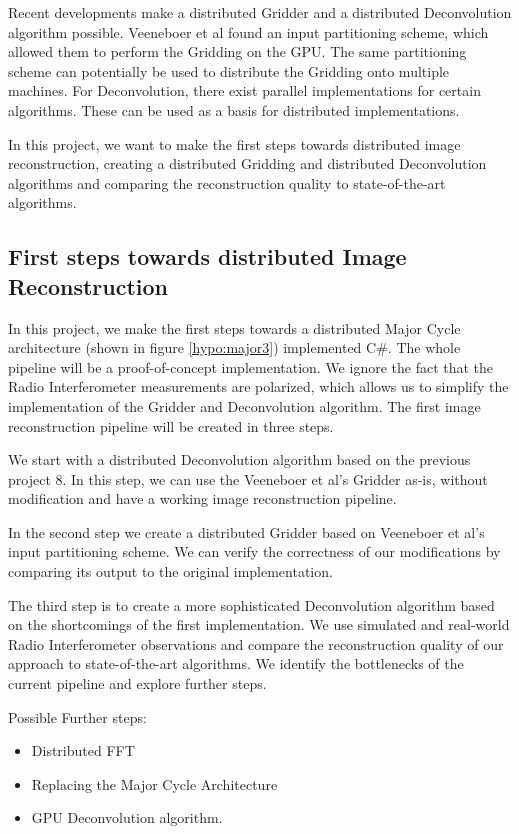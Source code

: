 Recent developments make a distributed Gridder and a distributed Deconvolution algorithm possible. Veeneboer et al\cite{veenboer2017image} found an input partitioning scheme, which allowed them to perform the Gridding on the GPU. The same partitioning scheme can potentially be used to distribute the Gridding onto multiple machines. For Deconvolution, there exist parallel implementations for certain algorithms\cite{dabbech2015moresane}. These can be used as a basis for distributed implementations.

In this project, we want to make the first steps towards distributed image reconstruction, creating a distributed Gridding and distributed Deconvolution algorithms and comparing the reconstruction quality to state-of-the-art algorithms.

\subsection{First steps towards distributed Image Reconstruction}
In this project, we make the first steps towards a distributed Major Cycle architecture (shown in figure \ref{hypo:major3}) implemented C\#. The whole pipeline will be a proof-of-concept implementation. We ignore the fact that the Radio Interferometer measurements are polarized, which allows us to simplify the implementation of the Gridder and Deconvolution algorithm. The first image reconstruction pipeline will be created in three steps.

We start with a distributed Deconvolution algorithm based on the previous project 8. In this step, we can use the Veeneboer et al's Gridder as-is, without modification and have a working image reconstruction pipeline.

In the second step we create a distributed Gridder based on Veeneboer et al's input partitioning scheme. We can verify the correctness of our modifications by comparing its output to the original implementation. 

The third step is to create a more sophisticated Deconvolution algorithm based on the shortcomings of the first implementation. We use simulated and real-world Radio Interferometer observations and compare the reconstruction quality of our approach to state-of-the-art algorithms. We identify the bottlenecks of the current pipeline and explore further steps.

Possible Further steps:
\begin{itemize}
	\item Distributed FFT
	\item Replacing the Major Cycle Architecture
	\item GPU Deconvolution algorithm.
\end{itemize}





